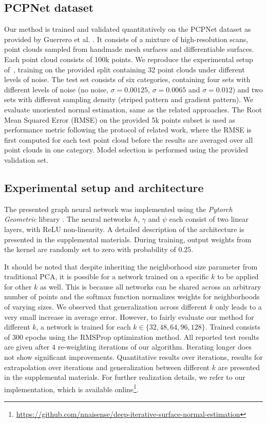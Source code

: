 \documentclass[10pt,twocolumn,letterpaper]{article}
\begin{document}
\subsection{PCPNet dataset}
\label{sec:dataset}
Our method is trained and validated quantitatively on the PCPNet dataset as
provided by Guerrero et al. \cite{Guerrero:2018}. 
It consists of a mixture of high-resolution scans, point clouds sampled
from handmade mesh surfaces and differentiable surfaces. 
Each point cloud consists of 100k points. 
We reproduce the experimental setup of~\cite{Ben-Shabat:2018, Guerrero:2018}, 
training on the provided split containing 32 point clouds under different
levels of noise. 
The test set consists of six categories, containing four sets with 
different levels of noise (no noise, $\sigma= 0.00125$, $\sigma= 0.0065$ 
and $\sigma= 0.012$) and two sets with different sampling density 
(striped pattern and gradient pattern). We evaluate  unoriented normal estimation, same as the related approaches.
The Root Mean Squared Error (RMSE) on the provided 5k points subset is 
used as performance metric following the protocol of related work, where the
RMSE is first computed for each test point cloud before the results are
averaged over all point clouds in one category.  
Model selection is performed using the provided validation set. 


\subsection{Experimental setup and architecture}
\label{sec:expsetup}
The presented graph neural network was implemented using the 
\emph{Pytorch Geometric} library \cite{Fey:2019}. The neural networks 
$h$, $\gamma$ and $\psi$ each consist of two linear layers, with ReLU
non-linearity. A detailed description of the architecture is
presented in the supplemental materials. During training, output weights from the kernel are randomly set to zero with probability of $0.25$. 

It should be noted that despite inheriting the neighborhood size parameter from traditional PCA, it is possible for a network trained on a
specific $k$ to be applied for other $k$ as well. 
This is because all networks can be shared across an arbitrary number of 
points and the softmax function normalizes weights for neighborhoods of
varying sizes. We observed that generalization
across different $k$ only leads to a very small increase in average
error. 
However, to fairly evaluate our method for different $k$, a network is trained for each $k \in \{32, 48, 64, 96, 128\}$.
Trained consists of 300 epochs using the RMSProp optimization 
method. 
All reported test results are given after $4$ re-weighting iterations of
our algorithm. Iterating longer does not show significant improvements. 
Quantitative results over iterations, results for extrapolation over iterations and generalization between different $k$ are presented in the 
supplemental materials. For further realization details, we refer to our implementation, which is available online\footnote{\footnotesize\url{https://github.com/nnaisense/deep-iterative-surface-normal-estimation}}.
\end{document}
